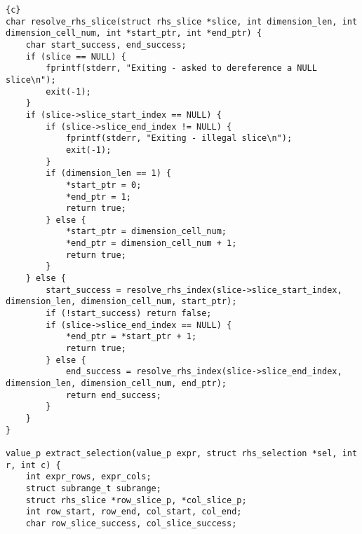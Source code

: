 \begin{lstlisting}{c}
char resolve_rhs_slice(struct rhs_slice *slice, int dimension_len, int dimension_cell_num, int *start_ptr, int *end_ptr) {
	char start_success, end_success;
	if (slice == NULL) {
		fprintf(stderr, "Exiting - asked to dereference a NULL slice\n");
		exit(-1);
	}
	if (slice->slice_start_index == NULL) {
		if (slice->slice_end_index != NULL) {
			fprintf(stderr, "Exiting - illegal slice\n");
			exit(-1);
		}
		if (dimension_len == 1) {
			*start_ptr = 0;
			*end_ptr = 1;
			return true;
		} else {
			*start_ptr = dimension_cell_num;
			*end_ptr = dimension_cell_num + 1;
			return true;
		}
	} else {
		start_success = resolve_rhs_index(slice->slice_start_index, dimension_len, dimension_cell_num, start_ptr);
		if (!start_success) return false;
		if (slice->slice_end_index == NULL) {
			*end_ptr = *start_ptr + 1;
			return true;
		} else {
			end_success = resolve_rhs_index(slice->slice_end_index, dimension_len, dimension_cell_num, end_ptr);
			return end_success;
		}
	}
}

value_p extract_selection(value_p expr, struct rhs_selection *sel, int r, int c) {
	int expr_rows, expr_cols;
	struct subrange_t subrange;
	struct rhs_slice *row_slice_p, *col_slice_p;
	int row_start, row_end, col_start, col_end;
	char row_slice_success, col_slice_success;


\end{lstlisting}
